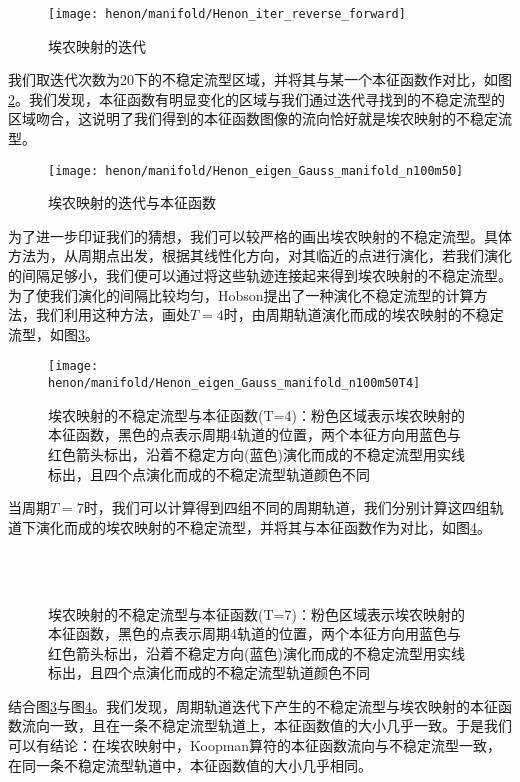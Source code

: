 \begin{figure}
	\centering
	\texttt{[image: henon/manifold/Henon\_iter\_reverse\_forward]}
    \caption{埃农映射的迭代}\label{fig:Henon_iter_reverse_forward}
\end{figure}
我们取迭代次数为20下的不稳定流型区域，并将其与某一个本征函数作对比，如图\ref{fig:Henon_eigen_Gauss_manifold_n100m50}。我们发现，本征函数有明显变化的区域与我们通过迭代寻找到的不稳定流型的区域吻合，这说明了我们得到的本征函数图像的流向恰好就是埃农映射的不稳定流型。
\begin{figure}
	\centering
	\texttt{[image: henon/manifold/Henon\_eigen\_Gauss\_manifold\_n100m50]}
    \caption{埃农映射的迭代与本征函数}\label{fig:Henon_eigen_Gauss_manifold_n100m50}
\end{figure}
为了进一步印证我们的猜想，我们可以较严格的画出埃农映射的不稳定流型。具体方法为，从周期点出发，根据其线性化方向，对其临近的点进行演化，若我们演化的间隔足够小，我们便可以通过将这些轨迹连接起来得到埃农映射的不稳定流型。为了使我们演化的间隔比较均匀，Hobson提出了一种演化不稳定流型的计算方法，我们利用这种方法，画处$T=4$时，由周期轨道演化而成的埃农映射的不稳定流型，如图\ref{fig:Henon_eigen_Gauss_manifold_n100m50T4}。
\begin{figure}
	\centering
	\texttt{[image: henon/manifold/Henon\_eigen\_Gauss\_manifold\_n100m50T4]}
    \caption[埃农映射的不稳定流型与本征函数]{埃农映射的不稳定流型与本征函数(T=4)：粉色区域表示埃农映射的本征函数，黑色的点表示周期4轨道的位置，两个本征方向用蓝色与红色箭头标出，沿着不稳定方向(蓝色)演化而成的不稳定流型用实线标出，且四个点演化而成的不稳定流型轨道颜色不同}\label{fig:Henon_eigen_Gauss_manifold_n100m50T4}
\end{figure}
当周期$T=7$时，我们可以计算得到四组不同的周期轨道，我们分别计算这四组轨道下演化而成的埃农映射的不稳定流型，并将其与本征函数作为对比，如图\ref{fig:Henon_eigen_Gauss_manifold_n100m50T7_4}。
\begin{figure}
    \centering
    \\
    \\
    \caption[埃农映射的不稳定流型与本征函数]{埃农映射的不稳定流型与本征函数(T=7)：粉色区域表示埃农映射的本征函数，黑色的点表示周期4轨道的位置，两个本征方向用蓝色与红色箭头标出，沿着不稳定方向(蓝色)演化而成的不稳定流型用实线标出，且四个点演化而成的不稳定流型轨道颜色不同}\label{fig:Henon_eigen_Gauss_manifold_n100m50T7_4}
\end{figure}
结合图\ref{fig:Henon_eigen_Gauss_manifold_n100m50T4}与图\ref{fig:Henon_eigen_Gauss_manifold_n100m50T7_4}。我们发现，周期轨道迭代下产生的不稳定流型与埃农映射的本征函数流向一致，且在一条不稳定流型轨道上，本征函数值的大小几乎一致。于是我们可以有结论：在埃农映射中，Koopman算符的本征函数流向与不稳定流型一致，在同一条不稳定流型轨道中，本征函数值的大小几乎相同。

